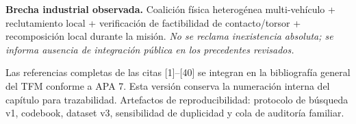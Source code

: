 \documentclass[10.5pt,a4paper]{article}
\newcommand{\note}[1]{\par{\setstretch{1}\fontsize{7.15}{8.0}\selectfont\color{muted}#1\par}}
\begin{document}
\vspace{3pt}
\noindent\colorbox{softblue}{\parbox{0.972\linewidth}{\fontsize{7.25}{8.0}\selectfont
\textbf{Brecha industrial observada.} Coalición física heterogénea multi-vehículo + reclutamiento local + verificación de factibilidad de contacto/torsor + recomposición local durante la misión. \textit{No se reclama inexistencia absoluta; se informa ausencia de integración pública en los precedentes revisados.}}}

\vspace{4pt}
\note{Las referencias completas de las citas [1]--[40] se integran en la bibliografía general del TFM conforme a APA 7. Esta versión conserva la numeración interna del capítulo para trazabilidad. Artefactos de reproducibilidad: protocolo de búsqueda v1, codebook, dataset v3, sensibilidad de duplicidad y cola de auditoría familiar.}
\end{document}
